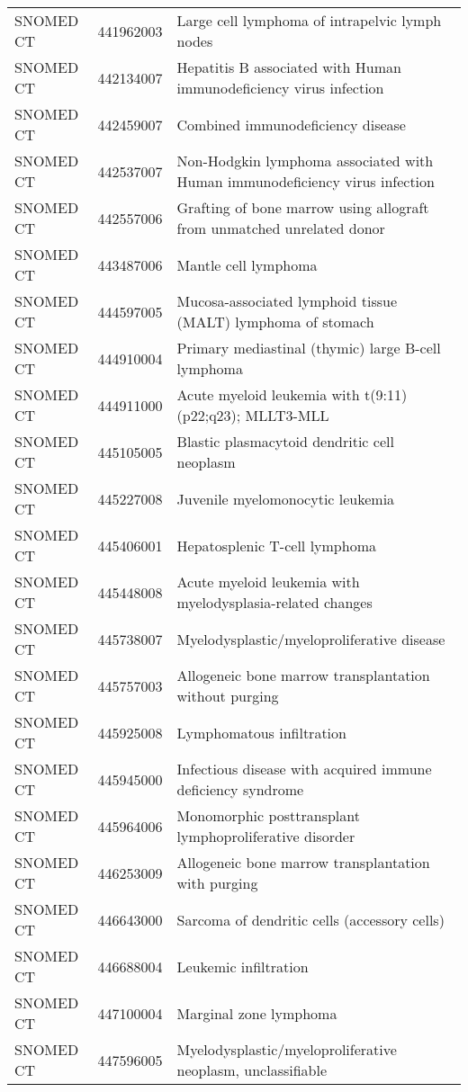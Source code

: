 \begin{longtable}{p{}p{}p{}}
  SNOMED CT & 441962003 & Large cell lymphoma of intrapelvic lymph nodes \\ 
  SNOMED CT & 442134007 & Hepatitis B associated with Human immunodeficiency virus infection \\ 
  SNOMED CT & 442459007 & Combined immunodeficiency disease \\ 
  SNOMED CT & 442537007 & Non-Hodgkin lymphoma associated with Human immunodeficiency virus infection \\ 
  SNOMED CT & 442557006 & Grafting of bone marrow using allograft from unmatched unrelated donor \\ 
  SNOMED CT & 443487006 & Mantle cell lymphoma \\ 
  SNOMED CT & 444597005 & Mucosa-associated lymphoid tissue (MALT) lymphoma of stomach \\ 
  SNOMED CT & 444910004 & Primary mediastinal (thymic) large B-cell lymphoma \\ 
  SNOMED CT & 444911000 & Acute myeloid leukemia with t(9:11)(p22;q23); MLLT3-MLL \\ 
  SNOMED CT & 445105005 & Blastic plasmacytoid dendritic cell neoplasm \\ 
  SNOMED CT & 445227008 & Juvenile myelomonocytic leukemia \\ 
  SNOMED CT & 445406001 & Hepatosplenic T-cell lymphoma \\ 
  SNOMED CT & 445448008 & Acute myeloid leukemia with myelodysplasia-related changes \\ 
  SNOMED CT & 445738007 & Myelodysplastic/myeloproliferative disease \\ 
  SNOMED CT & 445757003 & Allogeneic bone marrow transplantation without purging \\ 
  SNOMED CT & 445925008 & Lymphomatous infiltration \\ 
  SNOMED CT & 445945000 & Infectious disease with acquired immune deficiency syndrome \\ 
  SNOMED CT & 445964006 & Monomorphic posttransplant lymphoproliferative disorder \\ 
  SNOMED CT & 446253009 & Allogeneic bone marrow transplantation with purging \\ 
  SNOMED CT & 446643000 & Sarcoma of dendritic cells (accessory cells) \\ 
  SNOMED CT & 446688004 & Leukemic infiltration \\ 
  SNOMED CT & 447100004 & Marginal zone lymphoma \\ 
  SNOMED CT & 447596005 & Myelodysplastic/myeloproliferative neoplasm, unclassifiable \\ 

\end{longtable}
